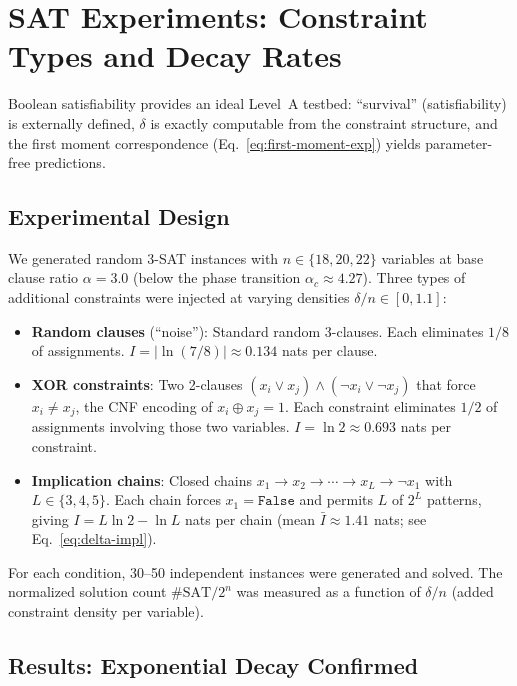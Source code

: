 \documentclass[11pt,a4paper]{article}
\begin{document}
\section{SAT Experiments: Constraint Types and Decay Rates}
\label{sec:sat}

Boolean satisfiability provides an ideal Level~A testbed: ``survival'' (satisfiability) is externally defined, $\delta$ is exactly computable from the constraint structure, and the first moment correspondence (Eq.~\ref{eq:first-moment-exp}) yields parameter-free predictions.

\subsection{Experimental Design}

We generated random 3-SAT instances with $n \in \{18, 20, 22\}$ variables at base clause ratio $\alpha = 3.0$ (below the phase transition $\alpha_c \approx 4.27$). Three types of additional constraints were injected at varying densities $\delta/n \in [0, 1.1]$:

\begin{itemize}
    \item \textbf{Random clauses} (``noise''): Standard random 3-clauses. Each eliminates $1/8$ of assignments. $I = |\ln(7/8)| \approx 0.134$ nats per clause.
    \item \textbf{XOR constraints}: Two 2-clauses $(x_i \lor x_j) \land (\neg x_i \lor \neg x_j)$ that force $x_i \neq x_j$, the CNF encoding of $x_i \oplus x_j = 1$. Each constraint eliminates $1/2$ of assignments involving those two variables. $I = \ln 2 \approx 0.693$ nats per constraint.
    \item \textbf{Implication chains}: Closed chains $x_1 \to x_2 \to \cdots \to x_L \to \neg x_1$ with $L \in \{3,4,5\}$. Each chain forces $x_1 = \mathtt{False}$ and permits $L$ of $2^L$ patterns, giving $I = L\ln 2 - \ln L$ nats per chain (mean $\bar{I} \approx 1.41$ nats; see Eq.~\ref{eq:delta-impl}).
\end{itemize}

For each condition, 30--50 independent instances were generated and solved. The normalized solution count $\#\text{SAT}/2^n$ was measured as a function of $\delta/n$ (added constraint density per variable).

\subsection{Results: Exponential Decay Confirmed}
\end{document}
